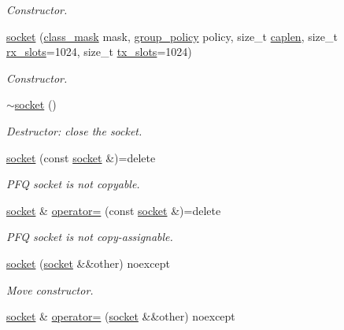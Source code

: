 \begin{DoxyCompactItemize}
\begin{DoxyCompactList}\small\item\em Constructor. \end{DoxyCompactList}\item 
\hyperlink{classpfq_1_1socket_abad0a4046d6af6c5b0b9b9759af6ff0a}{socket} (\hyperlink{namespacepfq_a96af1f5ed530eff563eb917516758fbb}{class\+\_\+mask} mask, \hyperlink{namespacepfq_ac41249c8510558905b01fa4d866a38d7}{group\+\_\+policy} policy, size\+\_\+t \hyperlink{classpfq_1_1socket_ab68dbba5ef01041b9c96758c4a9f0a6c}{caplen}, size\+\_\+t \hyperlink{classpfq_1_1socket_a5cf700fc12d67b91df3d669ac4aa737a}{rx\+\_\+slots}=1024, size\+\_\+t \hyperlink{classpfq_1_1socket_a019d15a072c043d6a1333ca0c836da4c}{tx\+\_\+slots}=1024)
\begin{DoxyCompactList}\small\item\em Constructor. \end{DoxyCompactList}\item 
\hyperlink{classpfq_1_1socket_a08fbdcc1736de36d205282ce20ffbaa3}{$\sim$socket} ()
\begin{DoxyCompactList}\small\item\em Destructor\+: close the socket. \end{DoxyCompactList}\item 
\hyperlink{classpfq_1_1socket_a517b6fdd622cdb2a64f2960176296f8d}{socket} (const \hyperlink{classpfq_1_1socket}{socket} \&)=delete
\begin{DoxyCompactList}\small\item\em P\+FQ socket is not copyable. \end{DoxyCompactList}\item 
\hyperlink{classpfq_1_1socket}{socket} \& \hyperlink{classpfq_1_1socket_a3cfd9674358a2ffd8b37e76d73b8a654}{operator=} (const \hyperlink{classpfq_1_1socket}{socket} \&)=delete
\begin{DoxyCompactList}\small\item\em P\+FQ socket is not copy-\/assignable. \end{DoxyCompactList}\item 
\hyperlink{classpfq_1_1socket_a1a60820551f1601beb54649d9ae48fa2}{socket} (\hyperlink{classpfq_1_1socket}{socket} \&\&other) noexcept
\begin{DoxyCompactList}\small\item\em Move constructor. \end{DoxyCompactList}\item 
\hyperlink{classpfq_1_1socket}{socket} \& \hyperlink{classpfq_1_1socket_a8022eafa68b84a840292ebcfc4d1ba7a}{operator=} (\hyperlink{classpfq_1_1socket}{socket} \&\&other) noexcept

\end{DoxyCompactItemize}
